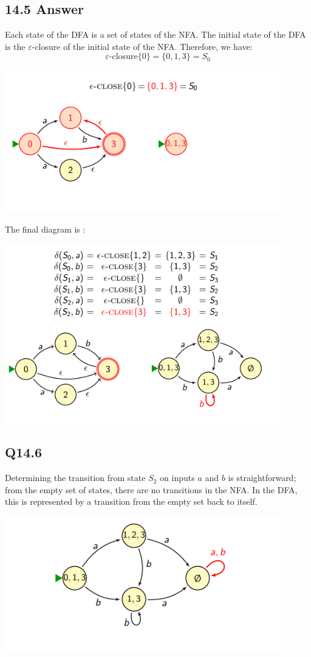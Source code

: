 \documentclass{article}
\begin{document}
\subsection*{14.5 Answer}
Each state of the DFA is a set of states of the NFA. The initial state of the DFA is the \(\varepsilon\)-closure of the initial state of the NFA. Therefore, we have:
\[\varepsilon\text{-closure}\{0\} = \{0, 1, 3\} = S_0\]
\begin{center}
    \includegraphics[width=12cm]{4.png}
\end{center}
The final diagram is : 
\begin{center}
    \includegraphics[width=12cm]{5.png}
\end{center}
\newpage
\subsection*{Q14.6}
Determining the transition from state \( S_2 \) on inputs \( a \) and \( b \) is straightforward; from the empty set of states, there are no transitions in the NFA. In the DFA, this is represented by a transition from the empty set back to itself.
\begin{center}
    \includegraphics[width=12cm]{6.png}
\end{center}
\newpage
\end{document}
